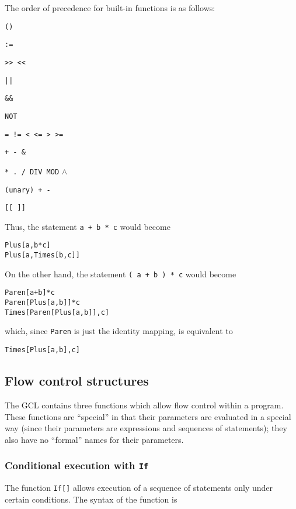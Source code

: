 The order of precedence for built-in functions is as follows:
\bd
\item
\verb+()+
\item
\verb+:=+
\item
\verb+>> <<+
\item
\verb+||+
\item
\verb+&&+
\item
\verb+NOT+
\item
\verb+= != < <= > >=+
\item
\verb&+ - &\verb+&+
\item
\verb+* . / DIV MOD+ $\wedge$
\item
\verb&(unary) + -&
\item
\verb+[[ ]]+
\ed

Thus, the statement \verb&a + b * c& would become 
\begin{verbatim}
Plus[a,b*c]
Plus[a,Times[b,c]]
\end{verbatim}

\noindent
On the other hand, the statement \verb&( a + b ) * c& would become 
\begin{verbatim}
Paren[a+b]*c
Paren[Plus[a,b]]*c
Times[Paren[Plus[a,b]],c]
\end{verbatim}

\noindent
which, since \verb+Paren+ is just the identity mapping, is equivalent to
\begin{verbatim}
Times[Plus[a,b],c]
\end{verbatim}

\medskip

\subsection{Flow control structures}

The GCL contains three functions which allow flow control within a
program.  These functions are ``special'' in that their parameters
are evaluated in a special way (since their parameters are expressions
and sequences of statements); they also have no ``formal'' names for
their parameters.

\subsubsection{Conditional execution with {\tt If}}

The function \verb+If[]+ allows execution of a sequence of statements
only under certain conditions.  The syntax of the function is

